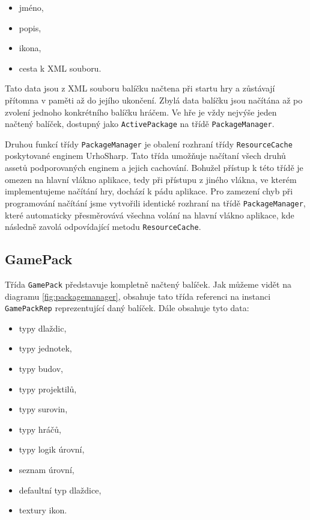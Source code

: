 \begin{itemize}
	\item jméno,
	\item popis,
	\item ikona,
	\item cesta k XML souboru.
\end{itemize}

Tato data jsou z XML souboru balíčku načtena při startu hry a zůstávají přítomna v paměti až do jejího ukončení. Zbylá data balíčku jsou načítána až po zvolení jednoho konkrétního balíčku hráčem. Ve hře je vždy nejvýše jeden načtený balíček, dostupný jako \texttt{ActivePackage} na třídě \texttt{PackageManager}.

Druhou funkcí třídy \texttt{PackageManager} je obalení rozhraní třídy \texttt{ResourceCache} poskytované enginem UrhoSharp. Tato třída umožňuje načítaní všech druhů assetů podporovaných enginem a jejich cachování. Bohužel přístup k této třídě je omezen na hlavní vlákno aplikace, tedy při přístupu z jiného vlákna, ve kterém implementujeme načítání hry, dochází k pádu aplikace. Pro zamezení chyb při programování načítání jsme vytvořili identické rozhraní na třídě \texttt{PackageManager}, které automaticky přesměrovává všechna volání na hlavní vlákno aplikace, kde následně zavolá odpovídající metodu \texttt{ResourceCache}.


\subsection{GamePack}
\label{sec:gamepack}


Třída \texttt{GamePack} představuje kompletně načtený balíček. Jak můžeme vidět na diagramu \ref{fig:packagemanager}, obsahuje tato třída referenci na instanci \texttt{GamePackRep} reprezentující daný balíček. Dále obsahuje tyto data:

\begin{itemize}
	\item typy dlaždic,
	\item typy jednotek,
	\item typy budov,
	\item typy projektilů,
	\item typy surovin,
	\item typy hráčů,
	\item typy logik úrovní,
	\item seznam úrovní,
	\item defaultní typ dlaždice,
	\item textury ikon.
\end{itemize}

